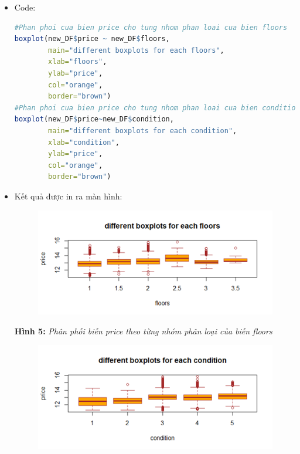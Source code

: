\documentclass[a4paper]{article}
\theoremstyle{definition}
\begin{document}
\begin{itemize}
\begin{enumerate}
\begin{enumerate}
        \begin{itemize}
            \item Code:
            \begin{lstlisting}[language=R, caption=Code for question 3e]
#Phan phoi cua bien price cho tung nhom phan loai cua bien floors
boxplot(new_DF$price ~ new_DF$floors,
        main="different boxplots for each floors",
        xlab="floors",
        ylab="price",
        col="orange",
        border="brown")
#Phan phoi cua bien price cho tung nhom phan loai cua bien condition
boxplot(new_DF$price~new_DF$condition,
        main="different boxplots for each condition",
        xlab="condition",
        ylab="price",
        col="orange",
        border="brown")
            \end{lstlisting} 
            
            \item Kết quả được in ra màn hình:
            
            \begin{figure}[H]
            \centering
            \includegraphics[scale=0.7]{3efloors.png}
            \label{fig:my_label}
            \end{figure}
        
            \begin{center}
            \textbf{Hình 5: }\textit{Phân phối biến price theo từng nhóm phân loại của biến floors}
            \end{center}
        
            \begin{figure}[H]
            \centering
            \includegraphics[scale=0.7]{3econdition.png}
            \label{fig:my_label}
            \end{figure}
            

\end{itemize}
\end{enumerate}
\end{enumerate}
\end{itemize}
\end{document}
